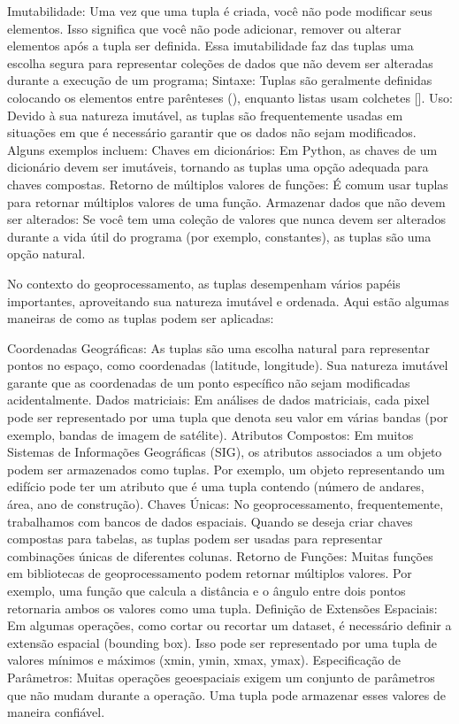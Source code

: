 \documentclass[letterpaper,10pt,english]{jupyterBook}
\begin{document}
\sphinxAtStartPar
Imutabilidade: Uma vez que uma tupla é criada, você não pode modificar seus elementos. Isso significa que você não pode adicionar, remover ou alterar elementos após a tupla ser definida. Essa imutabilidade faz das tuplas uma escolha segura para representar coleções de dados que não devem ser alteradas durante a execução de um programa;
Sintaxe: Tuplas são geralmente definidas colocando os elementos entre parênteses (), enquanto listas usam colchetes {[}{]}.
Uso: Devido à sua natureza imutável, as tuplas são frequentemente usadas em situações em que é necessário garantir que os dados não sejam modificados. Alguns exemplos incluem:
Chaves em dicionários: Em Python, as chaves de um dicionário devem ser imutáveis, tornando as tuplas uma opção adequada para chaves compostas.
Retorno de múltiplos valores de funções: É comum usar tuplas para retornar múltiplos valores de uma função.
Armazenar dados que não devem ser alterados: Se você tem uma coleção de valores que nunca devem ser alterados durante a vida útil do programa (por exemplo, constantes), as tuplas são uma opção natural.

\sphinxAtStartPar
No contexto do geoprocessamento, as tuplas desempenham vários papéis importantes, aproveitando sua natureza imutável e ordenada. Aqui estão algumas maneiras de como as tuplas podem ser aplicadas:

\sphinxAtStartPar
Coordenadas Geográficas: As tuplas são uma escolha natural para representar pontos no espaço, como coordenadas (latitude, longitude). Sua natureza imutável garante que as coordenadas de um ponto específico não sejam modificadas acidentalmente.
Dados matriciais: Em análises de dados matriciais, cada pixel pode ser representado por uma tupla que denota seu valor em várias bandas (por exemplo, bandas de imagem de satélite).
Atributos Compostos: Em muitos Sistemas de Informações Geográficas (SIG), os atributos associados a um objeto podem ser armazenados como tuplas. Por exemplo, um objeto representando um edifício pode ter um atributo que é uma tupla contendo (número de andares, área, ano de construção).
Chaves Únicas: No geoprocessamento, frequentemente, trabalhamos com bancos de dados espaciais. Quando se deseja criar chaves compostas para tabelas, as tuplas podem ser usadas para representar combinações únicas de diferentes colunas.
Retorno de Funções: Muitas funções em bibliotecas de geoprocessamento podem retornar múltiplos valores. Por exemplo, uma função que calcula a distância e o ângulo entre dois pontos retornaria ambos os valores como uma tupla.
Definição de Extensões Espaciais: Em algumas operações, como cortar ou recortar um dataset, é necessário definir a extensão espacial (bounding box). Isso pode ser representado por uma tupla de valores mínimos e máximos (xmin, ymin, xmax, ymax).
Especificação de Parâmetros: Muitas operações geoespaciais exigem um conjunto de parâmetros que não mudam durante a operação. Uma tupla pode armazenar esses valores de maneira confiável.
\end{document}
